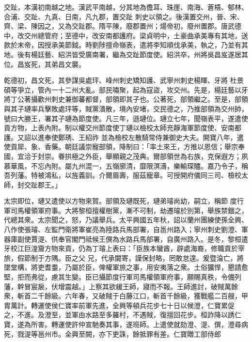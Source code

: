 
\begin{pinyinscope}

 交趾，本漢初南越之地。漢武平南越，分其地為儋耳、珠崖、南海、蒼梧、郁林、合浦、交趾、九真、日南，凡九郡，置交趾
 刺史以領之。後漢置交州，晉、宋、齊、梁、陳因之，又為交趾郡。隋平陳，廢郡置州；煬帝初，廢州置郡。唐武德中，改交州總管府；至德中，改安南都護府。梁貞明中，土豪曲承美專有其地，送款於末帝，因授承美節鉞。時劉陟擅命嶺表，遣將李知順伐承美，執之，乃並有其地。後有楊廷藝、紹洪皆受廣南署，繼為交趾節度使。紹洪卒，州將吳昌岌遂居其位。昌岌死，其弟昌文襲。



 乾德初，昌文死，其參謀吳處玶、峰州刺史矯知護、武寧州刺史楊暉、牙將
 杜景碩等爭立，管內一十二州大亂。部民嘯聚，起為寇盜，攻交州。先是，楊廷藝以牙將丁公著攝歡州刺史兼御蕃都督，部領即其子也。公著死，部領繼之。至是，部領與其子璉率兵擊敗處玶等，賊黨潰散，境內安堵，交民德之，乃推部領為交州帥，號曰大勝王，署其子璉為節度使。凡三年，遜璉位。璉立七年，聞嶺表平，遂遣使貢方物，上表內附。制以權交州節度使丁璉以檢校太師充靜海軍節度使、安南都護。又詔以進奉使鄭琇、王紹祚
 並為檢校左散騎常侍兼御史大夫。開寶八年，遣使貢犀、象、香藥。朝廷議崇寵部領，降制曰：「率土來王，方推以恩信；舉宗奉國，宜洽于封崇。眷拱極之外臣，舉顯親之茂典。爾部領世為右族，克保遐方；夙慕華風，不忘內附。屬九州混一，五嶺廓清，靡限溟濤，樂輸琛贐。嘉乃令子，稱吾列藩。特被鴻私，以旌義訓。介爾眉壽，服茲寵章。可授開府儀同三司、檢校太師，封交趾郡王。」



 太宗即位，璉又遣使以方物來賀。部領及璉既死，璉弟璿尚幼，嗣立，稱節
 度行軍司馬權領軍府事。大將黎桓擅權樹黨，漸不可制，劫遷璿於別第，舉族禁錮之，代總其衆。太宗聞之，怒，乃議舉兵。太平興國五年秋，詔以蘭州團練使孫全興、八作使張璿、左監門衛將軍崔亮為陸路兵馬部署，自邕州路入；寧州刺史劉澄、軍器庫副使賈湜、供奉官閣門祗候王僎為水路兵馬部署，自廣州路入。是冬，黎桓遣牙校江巨湟齎方物來貢，仍為丁璿上表曰：「臣族本蠻酋，辟處海裔，修職貢於宰旅，假節制于方隅。臣之父
 兄，代承閫寄，謹保封略，罔敢怠遑。爰暨淪亡，將墜堂構，將吏耆耋，乃屬於臣，俾權軍旅之事，用安夷落之衆。土俗獷悍，懇請愈堅，拒而弗從，慮其生變。臣已攝節度行軍司馬權領軍府事，願賜真秩，令備列藩，幹冒宸扆，伏增震越。」上察其欲緩王師，寢而不報。王師進討，破賊萬餘衆，斬首二千餘級。六年春，又破賊于白藤江口，斬首千餘級，獲戰艦二百艘，甲胄萬計。轉運使侯仁寶率前軍先進，全興等頓兵花步七十日以候澄，仁寶累促
 之，不進。及澄至，並軍由水路至多羅村，不遇賊，復擅回花步。桓詐降以誘仁寶，遂為所害。轉運使許仲宣馳奏其事，遂班師。上遣使就劾澄、湜、僎，澄尋病死，戮湜等邕州市。全興至闕，亦下吏誅，餘抵罪有差。仁寶贈工部侍郎




\end{pinyinscope}
